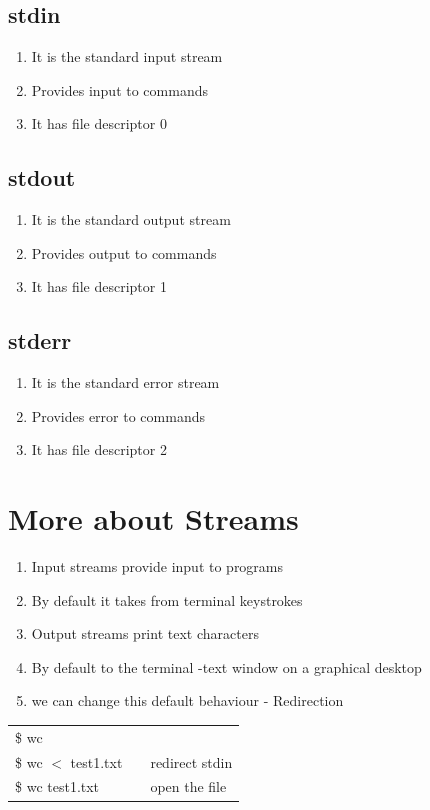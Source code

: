 \documentclass[12pt, a4paper]{report}
\begin{document}
\subsection{stdin}
\begin{enumerate}
\item It is the standard input stream
\item Provides input to commands
\item It has file descriptor 0
\end{enumerate}
\subsection{stdout}
\begin{enumerate}
\item It is the standard output stream
\item Provides output to commands
\item It has file descriptor 1
\end{enumerate}
\subsection{stderr}
\begin{enumerate}
\item It is the standard error stream
\item Provides error to commands
\item It has file descriptor 2
\end{enumerate}
\section{More about Streams}
\begin{enumerate}
\item Input streams provide input to programs
\item By default it takes from terminal keystrokes
	
\item Output streams print text characters
\item By default to the terminal -text window on a graphical desktop
	
\item we can change this default behaviour - Redirection
\end{enumerate}
\begin{tabular}{|lcl|}\hline
\$ wc && \\
\$ wc $<$ test1.txt && redirect stdin\\
\$ wc test1.txt && open the file \\ \hline
\end{tabular}
\end{document}
